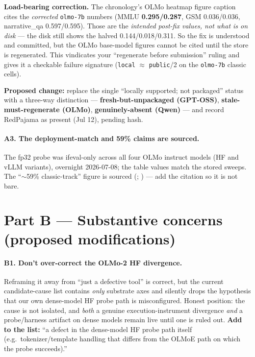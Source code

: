 \documentclass[11pt]{article}
\newcommand{\code}[1]{\texttt{#1}}
\begin{document}
\textbf{Load-bearing correction.} The chronology's OLMo heatmap figure caption cites the
\emph{corrected} \code{olmo-7b} numbers (MMLU \textbf{0.295/0.287}, GSM 0.036/0.036,
narrative\_qa 0.597/0.595). Those are the \emph{intended post-fix values, not what is on
disk} --- the disk still shows the halved 0.144/0.018/0.311. So the fix is understood and
committed, but the OLMo base-model figures cannot be cited until the store is
regenerated. This vindicates your ``regenerate before submission'' ruling and gives it a
checkable failure signature (\code{local} $\approx$ \code{public}/2 on the \code{olmo-7b}
classic cells).

\textbf{Proposed change:} replace the single ``locally supported; not packaged'' status
with a three-way distinction --- \textbf{fresh-but-unpackaged (GPT-OSS)},
\textbf{stale-must-regenerate (OLMo)}, \textbf{genuinely-absent (Qwen)} --- and record
RedPajama as present (Jul 12), pending hash.

\paragraph{A3. The deployment-match and 59\% claims are sourced.} The fp32 probe was
ifeval-only across all four OLMo instruct models (HF and vLLM variants), overnight
2026-07-08; the table values match the stored sweeps. The ``$\sim$59\% classic-track''
figure is sourced (; )
--- add the citation so it is not bare.

\section*{Part B --- Substantive concerns (proposed modifications)}

\paragraph{B1. Don't over-correct the OLMo-2 HF divergence.} Reframing it away from
``just a defective tool'' is correct, but the current candidate-cause list contains
\emph{only} substrate axes and silently drops the hypothesis that our own dense-model HF
probe path is misconfigured. Honest position: the cause is not isolated, and \emph{both}
a genuine execution-instrument divergence \emph{and} a probe/harness artifact on dense
models remain live until one is ruled out. \textbf{Add to the list:} ``a defect in the
dense-model HF probe path itself (e.g.\ tokenizer/template handling that differs from the
OLMoE path on which the probe succeeds).''
\end{document}
